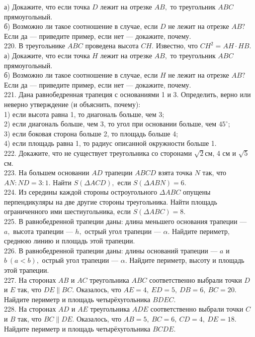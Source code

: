 а) Докажите, что если точка $D$ лежит на отрезке $AB,$ то треугольник $ABC$ прямоугольный.\\
б) Возможно ли такое соотношение в случае, если $D$ не лежит на отрезке $AB?$ Если да --- приведите пример, если нет --- докажите, почему.\\
220. В треугольнике $ABC$ проведена высота $CH.$ Известно, что $CH^2=AH\cdot HB.$\\
а) Докажите, что если точка $H$ лежит на отрезке $AB,$ то треугольник $ABC$ прямоугольный.\\
б) Возможно ли такое соотношение в случае, если $H$ не лежит на отрезке $AB?$ Если да --- приведите пример, если нет --- докажите, почему.\\
221. Дана равнобедренная трапеция с основаниями 1 и 3. Определить, верно или неверно утверждение (и объяснить, почему):\\
1) если высота равна 1, то диагональ больше, чем 3;\\
2) если диагональ больше, чем 3, то угол при основании больше, чем $45^\circ;$\\
3) если боковая сторона больше 2, то площадь больше 4;\\
4) если площадь равна 1, то радиус описанной окружности больше 1.\\
222. Докажите, что не существует треугольника со сторонами $\sqrt{2}$см, 4 см и $\sqrt{5}$ см.\\
223. На большем основании $AD$ трапеции $ABCD$ взята точка $N$ так, что $AN:ND=3:1.$ Найти $S(\Delta ACD),$ если $S(\Delta ABN)=6.$\\
224. Из середины каждой стороны остроугольного $\Delta ABC$ опущены перпендикуляры на две другие стороны треугольника. Найти площадь ограниченного ими шестиугольника, если $S(\Delta ABC)=8.$\\
225. В равнобедренной трапеции даны: длина меньшего основания трапеции --- $a,$ высота трапеции --- $h,$ острый угол трапеции --- $\alpha.$ Найдите периметр, среднюю линию и площадь этой трапеции.\\
226. В равнобедренной трапеции даны: длины оснований трапеции --- $a$ и $b\ (a<b),$ острый угол трапеции --- $\alpha.$ Найдите периметр, высоту и площадь этой трапеции.\\
227. На сторонах $AB$ и $AC$ треугольника $ABC$ соответственно выбрали точки $D$ и $E$ так, что $DE\parallel BC.$ Оказалось, что $AE=4,\ ED=5,\ DB=6,\ BC=20.$ Найдите периметр и площадь четырёхугольника $BDEC.$\\
228. На сторонах $AD$ и $AE$ треугольника $ADE$ соответственно выбрали точки $C$ и $B$ так, что $BC\parallel DE.$ Оказалось, что $AB=5,\ BC=6,\ CD=4,\ DE=18.$ Найдите периметр и площадь четырёхугольника $BCDE.$\\
